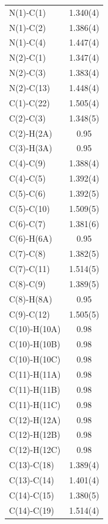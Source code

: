\begin{center}
\tablefirsthead{%
\toprule}
\tablelasttail{\bottomrule}
{\footnotesize \singlespacing
\begin{supertabular}{p{1.5in}c}
N(1)-C(1) &1.340(4)\\
N(1)-C(2) &1.386(4)\\
N(1)-C(4) &1.447(4)\\
N(2)-C(1) &1.347(4)\\
N(2)-C(3) &1.383(4)\\
N(2)-C(13) &1.448(4)\\
C(1)-C(22) &1.505(4)\\
C(2)-C(3) &1.348(5)\\
C(2)-H(2A) &0.95\\
C(3)-H(3A) &0.95\\
C(4)-C(9) &1.388(4)\\
C(4)-C(5) &1.392(4)\\
C(5)-C(6) &1.392(5)\\
C(5)-C(10) &1.509(5)\\
C(6)-C(7) &1.381(6)\\
C(6)-H(6A) &0.95\\
C(7)-C(8) &1.382(5)\\
C(7)-C(11) &1.514(5)\\
C(8)-C(9) &1.389(5)\\
C(8)-H(8A) &0.95\\
C(9)-C(12) &1.505(5)\\
C(10)-H(10A) &0.98\\
C(10)-H(10B) &0.98\\
C(10)-H(10C) &0.98\\
C(11)-H(11A) &0.98\\
C(11)-H(11B) &0.98\\
C(11)-H(11C) &0.98\\
C(12)-H(12A) &0.98\\
C(12)-H(12B) &0.98\\
C(12)-H(12C) &0.98\\
C(13)-C(18) &1.389(4)\\
C(13)-C(14) &1.401(4)\\
C(14)-C(15) &1.380(5)\\
C(14)-C(19) &1.514(4)\\

\end{supertabular}}
\end{center}

